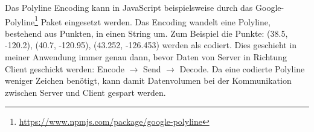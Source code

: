       Das Polyline Encoding kann in JavaScript beispielsweise durch das Google-Polyline\footnote{\url{https://www.npmjs.com/package/google-polyline}} Paket eingesetzt werden. Das Encoding wandelt eine Polyline, bestehend aus Punkten, in einen String um. Zum Beispiel die Punkte: (38.5, -120.2), (40.7, -120.95), (43.252, -126.453) werden als
      \colorbox{materialGrey}{\texttt{\color{white}{\_p\textasciitilde iF\textasciitilde ps|U\_ulLnnqC\_mqNvxq`@}}}
      codiert. Dies geschieht in meiner Anwendung immer genau dann, bevor Daten von Server in Richtung Client geschickt werden: Encode $\rightarrow$ Send $\rightarrow$ Decode. Da eine codierte Polyline weniger Zeichen benötigt, kann damit Datenvolumen bei der Kommunikation zwischen Server und Client gespart werden.


